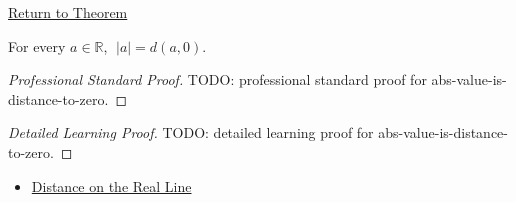 \newpage
{}
\label{prf:abs-value-is-distance-to-zero}

\begin{remark*}[Return]
\hyperref[prop:abs-value-is-distance-to-zero]{Return to Theorem}
\end{remark*}

\begin{proposition*}
For every $a\in\mathbb{R}$, $\;|a|=d(a,0)$.
\end{proposition*}

\begin{proof}[Professional Standard Proof]
\LRAProofBodyStart
TODO: professional standard proof for abs-value-is-distance-to-zero.
\end{proof}

\begin{proof}[Detailed Learning Proof]
\LRAProofBodyStart
TODO: detailed learning proof for abs-value-is-distance-to-zero.
\end{proof}

\begin{remark*}
\end{remark*}

\begin{dependencies}
\begin{itemize}
  \item \hyperref[def:distance-on-real-line]{Distance on the Real Line}
\end{itemize}
\end{dependencies}

\clearpage
